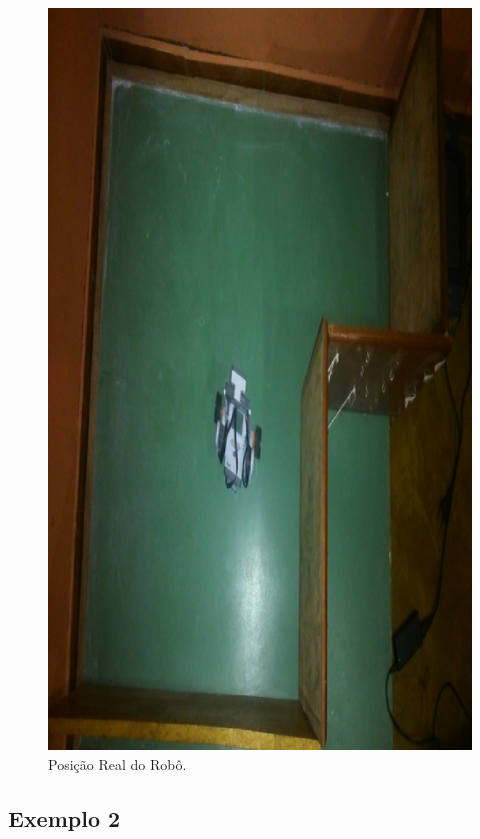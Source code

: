 \begin{figure}[H]
  \centering
  \includegraphics[scale=1]{figuras/cen4_ex1/real.eps}
  \caption[Posição Real do Robô]{Posição Real do Robô.}
  \label{img:cen4_ex1_real}
\end{figure}


\subsection{Exemplo 2}


